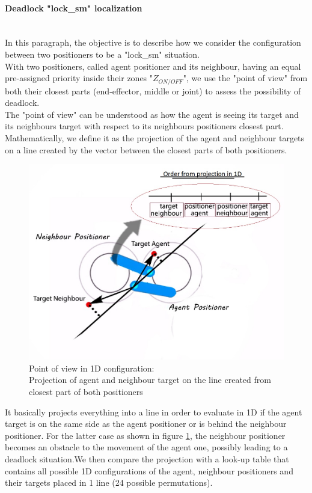 \documentclass[]{spie}  %
\begin{document}
	\paragraph{Deadlock "lock\_sm" localization}\mbox{}\\
	In this paragraph, the objective is to describe how we consider the configuration between two positioners to be a "lock\_sm" situation.\\
	With two positioners, called agent positioner and its neighbour, having an equal pre-assigned priority inside their zones "$Z_{ON/OFF}$", we use the "point of view" from both their closest parts (end-effector, middle or joint) to assess the possibility of deadlock.\\
	The "point of view" can be understood as how the agent is seeing its target and its neighbours target with respect to its neighbours positioners closest part.
	Mathematically, we define it as the projection of the agent and neighbour targets on a line created by the vector between the closest parts of both positioners.\\
	\begin{figure}[H]
		\centering
		\includegraphics[scale=0.4]{images/Projection1.jpg}
		\caption{\centering Point of view in 1D configuration:\\
			 Projection of agent and neighbour target on the line created from closest part of both positioners}
		\label{projection}
	\end{figure}
	It basically projects everything into a line in order to evaluate in 1D if the agent target is on the same side as the agent positioner or is behind the neighbour positioner. For the latter case as shown in figure \ref{projection}, the neighbour positioner becomes an obstacle to the movement of the agent one, possibly leading to a deadlock situation.We then compare the projection with a look-up table that contains all possible 1D configurations of the agent, neighbour positioners and their targets placed in 1 line (24 possible permutations).\\
\end{document}
